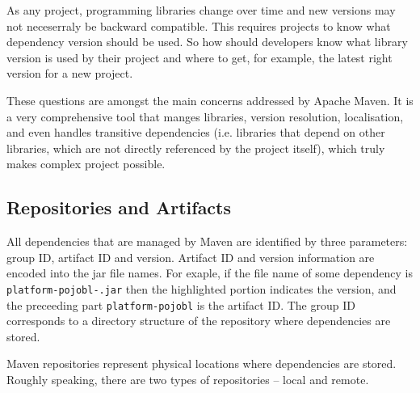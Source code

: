   As any project, programming libraries change over time and new versions may not neceserraly be backward compatible.
  This requires projects to know what dependency version should be used.
  So how should developers know what library version is used by their project and where to get, for example, the latest right version for a new project.

  These questions are amongst the main concerns addressed by Apache Maven.
  It is a very comprehensive tool that manges libraries, version resolution, localisation, and even handles transitive dependencies (i.e. libraries that depend on other libraries, which are not directly referenced by the project itself), which truly makes complex project possible.

  \subsection*{Repositories and Artifacts}
  All dependencies that are managed by Maven are identified by three parameters: group ID, artifact ID and version.
  Artifact ID and version information are encoded into the jar file names.
  For exaple, if the file name of some dependency is \texttt{platform-pojobl-.jar} then the highlighted portion \texttt{} indicates the version, and the preceeding part \texttt{platform-pojobl} is the artifact ID.
  The group ID corresponds to a directory structure of the repository where dependencies are stored.

  Maven repositories represent physical locations where dependencies are stored.
  Roughly speaking, there are two types of repositories -- local and remote.
  

